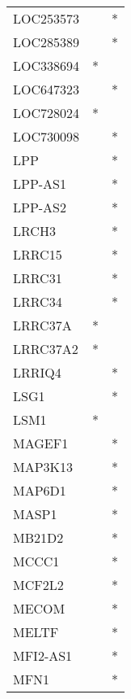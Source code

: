 \begin{longtable}{lcc}
LOC253573        &                &          * \\
LOC285389        &                &          * \\
LOC338694        &              * &            \\
LOC647323        &                &          * \\
LOC728024        &              * &            \\
LOC730098        &                &          * \\
LPP              &                &          * \\
LPP-AS1          &                &          * \\
LPP-AS2          &                &          * \\
LRCH3            &                &          * \\
LRRC15           &                &          * \\
LRRC31           &                &          * \\
LRRC34           &                &          * \\
LRRC37A          &              * &            \\
LRRC37A2         &              * &            \\
LRRIQ4           &                &          * \\
LSG1             &                &          * \\
LSM1             &              * &            \\
MAGEF1           &                &          * \\
MAP3K13          &                &          * \\
MAP6D1           &                &          * \\
MASP1            &                &          * \\
MB21D2           &                &          * \\
MCCC1            &                &          * \\
MCF2L2           &                &          * \\
MECOM            &                &          * \\
MELTF            &                &          * \\
MFI2-AS1         &                &          * \\
MFN1             &                &          * \\

\end{longtable}
